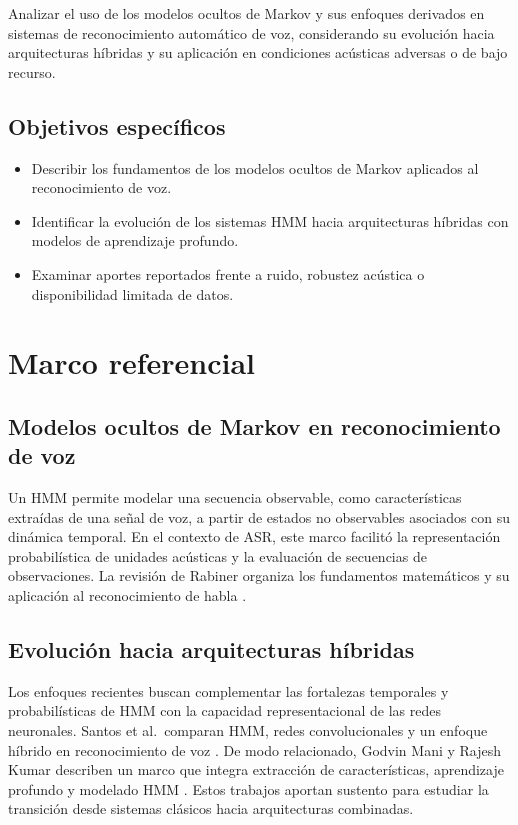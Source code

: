 \documentclass[12pt,a4paper]{article}
\begin{document}
Analizar el uso de los modelos ocultos de Markov y sus enfoques derivados en sistemas de reconocimiento automático de voz, considerando su evolución hacia arquitecturas híbridas y su aplicación en condiciones acústicas adversas o de bajo recurso.

\subsection{Objetivos específicos}

\begin{itemize}
  \item Describir los fundamentos de los modelos ocultos de Markov aplicados al reconocimiento de voz.
  \item Identificar la evolución de los sistemas HMM hacia arquitecturas híbridas con modelos de aprendizaje profundo.
  \item Examinar aportes reportados frente a ruido, robustez acústica o disponibilidad limitada de datos.
\end{itemize}

\section{Marco referencial}

\subsection{Modelos ocultos de Markov en reconocimiento de voz}

Un HMM permite modelar una secuencia observable, como características extraídas de una señal de voz, a partir de estados no observables asociados con su dinámica temporal. En el contexto de ASR, este marco facilitó la representación probabilística de unidades acústicas y la evaluación de secuencias de observaciones. La revisión de Rabiner organiza los fundamentos matemáticos y su aplicación al reconocimiento de habla \cite{Rabiner1989}.

\subsection{Evolución hacia arquitecturas híbridas}

Los enfoques recientes buscan complementar las fortalezas temporales y probabilísticas de HMM con la capacidad representacional de las redes neuronales. Santos et al.\ comparan HMM, redes convolucionales y un enfoque híbrido en reconocimiento de voz \cite{Santos2025}. De modo relacionado, Godvin Mani y Rajesh Kumar describen un marco que integra extracción de características, aprendizaje profundo y modelado HMM \cite{GodvinMani2025}. Estos trabajos aportan sustento para estudiar la transición desde sistemas clásicos hacia arquitecturas combinadas.
\end{document}
